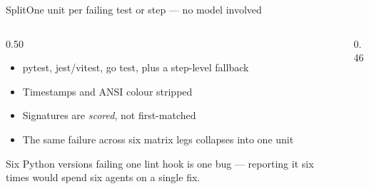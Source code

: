 \documentclass[aspectratio=169,10pt]{beamer}
\begin{document}
\begin{frame}{Split}{One unit per failing test or step --- no model involved}
\vspace{0.1cm}
\begin{columns}[T]
\begin{column}{0.50\textwidth}
\begin{itemize}\setlength\itemsep{0.45em}
  \item pytest, jest/vitest, go test, plus a step-level fallback
  \item Timestamps and ANSI colour stripped
  \item Signatures are \emph{scored}, not first-matched
  \item \textcolor{ink}{The same failure across six matrix legs collapses into one unit}
\end{itemize}
\vspace{0.3em}
{\footnotesize\textcolor{muted}{Six Python versions failing one lint hook is one
bug --- reporting it six times would spend six agents on a single fix.}}
\end{column}
\begin{column}{0.46\textwidth}
\end{column}
\end{columns}
\end{frame}
\end{document}
